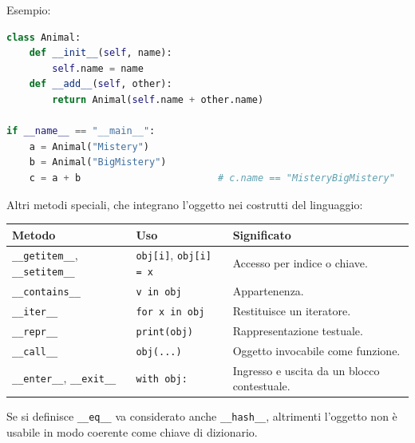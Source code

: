 \documentclass[12pt]{extarticle}
\begin{document}
\noindent Esempio:
\begin{lstlisting}[language=Python]
class Animal:
    def __init__(self, name):
        self.name = name
    def __add__(self, other):
        return Animal(self.name + other.name)

if __name__ == "__main__":
    a = Animal("Mistery")
    b = Animal("BigMistery")
    c = a + b                        # c.name == "MisteryBigMistery"
\end{lstlisting}
Altri metodi speciali, che integrano l'oggetto nei costrutti del linguaggio:
\begin{center}
\small
\begin{tabular}{p{4.6cm}p{4.0cm}p{5.6cm}}
    \toprule
    \textbf{Metodo} & \textbf{Uso} & \textbf{Significato} \\
    \midrule
    \texttt{\_\_getitem\_\_}, \texttt{\_\_setitem\_\_} & \texttt{obj[i]}, \texttt{obj[i] = x} & Accesso per indice o chiave. \\
    \addlinespace
    \texttt{\_\_contains\_\_} & \texttt{v in obj} & Appartenenza. \\
    \addlinespace
    \texttt{\_\_iter\_\_} & \texttt{for x in obj} & Restituisce un iteratore. \\
    \addlinespace
    \texttt{\_\_repr\_\_} & \texttt{print(obj)} & Rappresentazione testuale. \\
    \addlinespace
    \texttt{\_\_call\_\_} & \texttt{obj(...)} & Oggetto invocabile come funzione. \\
    \addlinespace
    \texttt{\_\_enter\_\_}, \texttt{\_\_exit\_\_} & \texttt{with obj:} & Ingresso e uscita da un blocco contestuale. \\
    \bottomrule
\end{tabular}
\end{center}
Se si definisce \texttt{\_\_eq\_\_} va considerato anche \texttt{\_\_hash\_\_}, altrimenti l'oggetto non è usabile in modo coerente come chiave di dizionario.
\end{document}
